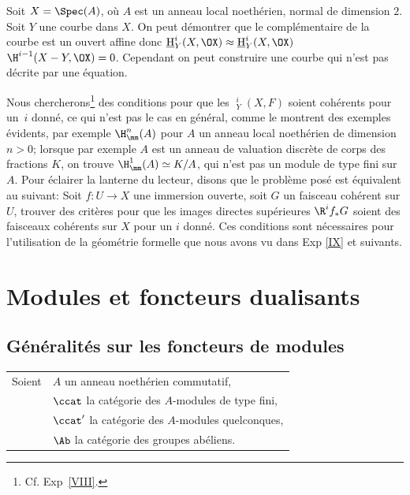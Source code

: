\begin{exemple} \label{III.3.13}
Soit $X=\Spec (A)$, o\`u $A$ est un anneau local noeth\'erien, normal de dimension $2$. Soit $Y$ une courbe dans $X$. On peut d\'emontrer que le compl\'ementaire de la courbe est un ouvert affine donc $\mathop{\underline{\mathrm{H}}}\nolimits_Y^i(X, \OX) \approx \mathop{\underline{\mathrm{H}}}\nolimits_Y^i(X, \OX)$ $\H^{i-1}(X-Y, \OX)=0$. Cependant on peut construire une courbe qui n'est pas d\'ecrite par une \'equation.
\end{exemple}

Nous chercherons\footnote{Cf. Exp~\ref{VIII}.} des conditions pour que les $\mathop{\underline{\mathrm{H}}}\nolimits_Y^i(X, F)$ soient coh\'erents pour un~$i$ donn\'e, ce qui n'est pas le cas en g\'en\'eral, comme le montrent des exemples \'evidents, par exemple $\H_\mm^n(A)$ pour $A$ un anneau local noeth\'erien de dimension $n>0$; lorsque par exemple $A$ est un anneau de valuation discr\`ete de corps des fractions $K$, on trouve $\H_\mm^1(A) \simeq K/A$, qui n'est pas un module de type fini sur $A$. Pour \'eclairer la lanterne du lecteur, disons que le probl\`eme pos\'e est \'equivalent au suivant: Soit $f:U\to X$ une immersion ouverte, soit $G$ un faisceau coh\'erent sur $U$, trouver des crit\`eres pour que les images directes sup\'erieures $\R^i f_* G$ soient des faisceaux coh\'erents sur $X$ pour un $i$ donn\'e. Ces conditions sont n\'ecessaires pour l'utilisation de la g\'eom\'etrie formelle que nous avons vu dans Exp \ref{IX} et \ignorespaces suivants.

\chapter{Modules et foncteurs dualisants} \label{IV}

\section{G\'en\'eralit\'es sur les foncteurs de modules} \label{IV.1}
\ignorespaces
\hspace*{-3mm}
\begin{tabular}{ll}
Soient &$A$ un anneau noeth\'erien commutatif,\\
&$\ccat$ la cat\'egorie des $A$-modules de type fini,\\
&$\ccat'$ la cat\'egorie des $A$-modules quelconques,\\
&$\Ab$ la cat\'egorie des groupes ab\'eliens.{toto}\label{pIV.1}
\end{tabular}

